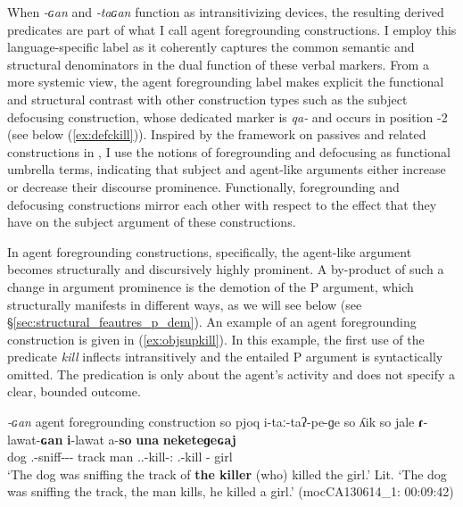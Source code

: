 \documentclass[12pt]{article}
\begin{document}
When \textit{-ɢan} and \textit{-taɢan} function as intransitivizing devices, the resulting derived predicates are part of what I call agent foregrounding constructions. I employ this language-specific label as it coherently captures the common semantic and structural denominators in the dual function of these verbal markers. %
    From a more systemic view, the agent foregrounding label makes explicit the functional and structural contrast with other construction types such as the subject defocusing construction, whose dedicated marker is \textit{qa-} and occurs in position -2 (see below (\ref{ex:defckill})).  Inspired by the framework on passives and related constructions in \citet{Shibatani1985a}, I use the notions of foregrounding and defocusing  as functional umbrella terms, indicating that subject and agent-like arguments either increase or decrease their discourse prominence. Functionally,  foregrounding and defocusing constructions mirror each other with respect to the effect that they have on the subject argument of these constructions.  

In agent foregrounding constructions, specifically, the agent-like argument becomes structurally and discursively highly prominent. A by-product of such a change in argument prominence is the demotion of the P argument, which structurally manifests in different ways, as we will see below (see \S \ref{sec:structural_feautres_p_dem}). An example of an agent foregrounding construction is given in (\ref{ex:objsupkill}). In this example, the first use of the predicate \textit{kill} inflects intransitively and the entailed P argument is syntactically omitted. The predication is only about the agent's activity and does not specify a clear, bounded outcome.  

\begin{exe}
\ex \textit{-ɢan} agent foregrounding construction
	 \gll so pjoq i-taː-taʔ-pe-ɡe so ʎik so jale \textbf{ɾ}-lawat-\textbf{ɢan} \textbf{i}-lawat a-\textbf{so} \textbf{una}{\Sploan} \textbf{neketeɡeɢaj}   \\
	{\DetTwo} dog {\Third.\II}-sniff-{\Pl}-{\Prog}-{\LocTwo} {\DetTwo} track {\DetTwo} man {\Third.\II.\Intr}-kill-{\Vm:\Intr}   {\Third.\II}-kill {\F}-{\DetTwo} {\Det} girl   \\
	\trans `The dog was sniffing the track of \textbf{the killer} (who) killed the girl.'
	\trans Lit. `The dog was sniffing the track, the man kills, he killed a girl.'
		\trans\hfill (mocCA130614\_1: 00:09:42)\label{ex:objsupkill}
\end{exe}
\end{document}
